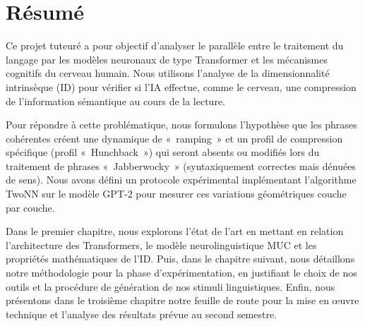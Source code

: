 \chapter*{Résumé}

Ce projet tuteuré a pour objectif d'analyser le parallèle entre le traitement du langage par les modèles neuronaux de type Transformer et les mécanismes cognitifs du cerveau humain. Nous utilisons l'analyse de la dimensionnalité intrinsèque (ID) pour vérifier si l'IA effectue, comme le cerveau, une compression de l'information sémantique au cours de la lecture.

Pour répondre à cette problématique, nous formulons l'hypothèse que les phrases cohérentes créent une dynamique de «~ramping~» et un profil de compression spécifique (profil «~Hunchback~») qui seront absents ou modifiés lors du traitement de phrases «~Jabberwocky~» (syntaxiquement correctes mais dénuées de sens). Nous avons défini un protocole expérimental implémentant l'algorithme TwoNN sur le modèle GPT-2 pour mesurer ces variations géométriques couche par couche.

Dans le premier chapitre, nous explorons l'état de l'art en mettant en relation l'architecture des Transformers, le modèle neurolinguistique MUC et les propriétés mathématiques de l'ID. Puis, dans le chapitre suivant, nous détaillons notre méthodologie pour la phase d'expérimentation, en justifiant le choix de nos outils et la procédure de génération de nos stimuli linguistiques. Enfin, nous présentons dans le troisième chapitre notre feuille de route pour la mise en œuvre technique et l'analyse des résultats prévue au second semestre.